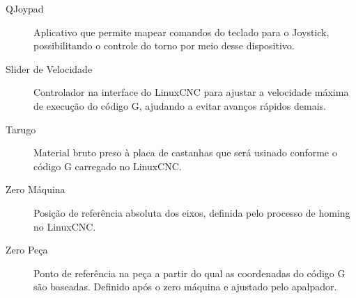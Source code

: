 \documentclass[twoside,a4paper]{refart}
\begin{document}
\begin{description}
	\item[QJoypad] Aplicativo que permite mapear comandos do teclado para o Joystick, possibilitando o controle do torno por meio desse dispositivo.
	
	\item[Slider de Velocidade] Controlador na interface do LinuxCNC para ajustar a velocidade máxima de execução do código G, ajudando a evitar avanços rápidos demais.
	
	\item[Tarugo] Material bruto preso à placa de castanhas que será usinado conforme o código G carregado no LinuxCNC.
	
	\item[Zero Máquina] Posição de referência absoluta dos eixos, definida pelo processo de homing no LinuxCNC.
	
	\item[Zero Peça] Ponto de referência na peça a partir do qual as coordenadas do código G são baseadas. Definido após o zero máquina e ajustado pelo apalpador.
\end{description}
\end{document}
